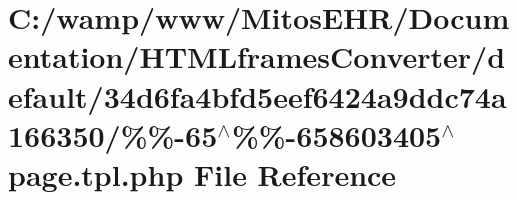\hypertarget{default_234d6fa4bfd5eef6424a9ddc74a166350_2_06_06-65_05_06_06-658603405_05page_8tpl_8php}{\section{\-C\-:/wamp/www/\-Mitos\-E\-H\-R/\-Documentation/\-H\-T\-M\-Lframes\-Converter/default/34d6fa4bfd5eef6424a9ddc74a166350/\%\%-\/65$^\wedge$\%\%-\/658603405$^\wedge$page.tpl.\-php \-File \-Reference}
\label{default_234d6fa4bfd5eef6424a9ddc74a166350_2_06_06-65_05_06_06-658603405_05page_8tpl_8php}
}
